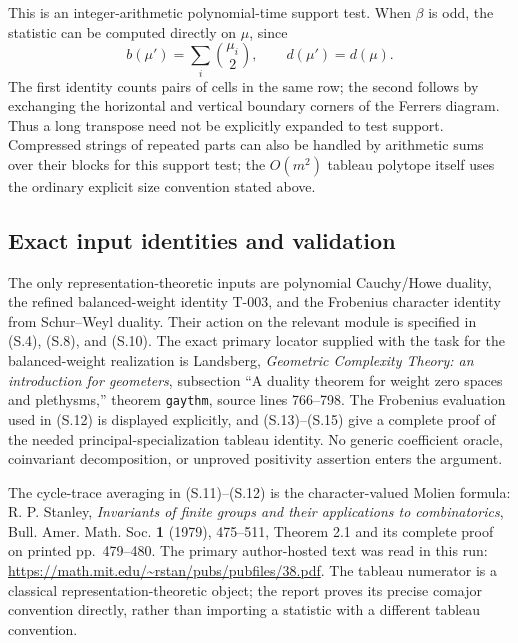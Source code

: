\documentclass[
  10pt,
]{article}
\begin{document}
This is an integer-arithmetic polynomial-time support test. When
\(\beta\) is odd, the statistic can be computed directly on \(\mu\),
since \[
b(\mu')=\sum_i\binom{\mu_i}{2},\qquad d(\mu')=d(\mu).
\tag{S.26}
\] The first identity counts pairs of cells in the same row; the second
follows by exchanging the horizontal and vertical boundary corners of
the Ferrers diagram. Thus a long transpose need not be explicitly
expanded to test support. Compressed strings of repeated parts can also
be handled by arithmetic sums over their blocks for this support test;
the \(O(m^2)\) tableau polytope itself uses the ordinary explicit size
convention stated above.

\subsection{Exact input identities and
validation}\label{exact-input-identities-and-validation}

The only representation-theoretic inputs are polynomial Cauchy/Howe
duality, the refined balanced-weight identity T-003, and the Frobenius
character identity from Schur--Weyl duality. Their action on the
relevant module is specified in (S.4), (S.8), and (S.10). The exact
primary locator supplied with the task for the balanced-weight
realization is Landsberg, \emph{Geometric Complexity Theory: an
introduction for geometers}, subsection ``A duality theorem for weight
zero spaces and plethysms,'' theorem \texttt{\small gaythm}, source
lines 766--798. The Frobenius evaluation used in (S.12) is displayed
explicitly, and (S.13)--(S.15) give a complete proof of the needed
principal-specialization tableau identity. No generic coefficient
oracle, coinvariant decomposition, or unproved positivity assertion
enters the argument.

The cycle-trace averaging in (S.11)--(S.12) is the character-valued
Molien formula: R. P. Stanley, \emph{Invariants of finite groups and
their applications to combinatorics}, Bull. Amer. Math. Soc. \textbf{1}
(1979), 475--511, Theorem 2.1 and its complete proof on printed
pp.~479--480. The primary author-hosted text was read in this run:
\url{https://math.mit.edu/~rstan/pubs/pubfiles/38.pdf}. The tableau
numerator is a classical representation-theoretic object; the report
proves its precise comajor convention directly, rather than importing a
statistic with a different tableau convention.
\end{document}
